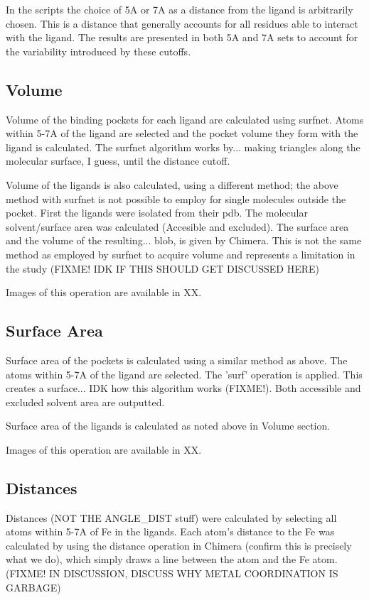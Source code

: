 	In the scripts the choice of 5A or 7A as a distance from the ligand is arbitrarily chosen. This is a distance that generally accounts for all residues able to interact with the ligand. The results are presented in both 5A and 7A sets to account for the variability introduced by these cutoffs. 
	
		\subsection*{Volume}
		
		Volume of the binding pockets for each ligand are calculated using surfnet. Atoms within 5-7A of the ligand are selected and the pocket volume they form with the ligand is calculated. The surfnet algorithm works by... making triangles along the molecular surface, I guess, until the distance cutoff.
		
		Volume of the ligands is also calculated, using a different method; the above method with surfnet is not possible to employ for single molecules outside the pocket. First the ligands were isolated from their pdb. The molecular solvent/surface area was calculated (Accesible and excluded). The surface area and the volume of the resulting... blob, is given by Chimera. This is not the same method as employed by surfnet to acquire volume and represents a limitation in the study (FIXME! IDK IF THIS SHOULD GET DISCUSSED HERE)
		
		Images of this operation are available in XX.
		
		\subsection*{Surface Area}
		Surface area of the pockets is calculated using a similar method as above. The atoms within 5-7A of the ligand are selected. The 'surf' operation is applied. This creates a surface... IDK how this algorithm works (FIXME!). Both accessible and excluded solvent area are outputted.
		
		Surface area of the ligands is calculated as noted above in Volume section.
	
		Images of this operation are available in XX. 
		
		\subsection*{Distances}
		
		Distances (NOT THE ANGLE_DIST stuff) were calculated by selecting all atoms within 5-7A of Fe in the ligands. Each atom's distance to the Fe was calculated by using the distance operation in Chimera (confirm this is precisely what we do), which simply draws a line between the atom and the Fe atom. (FIXME! IN DISCUSSION, DISCUSS WHY METAL COORDINATION IS GARBAGE) 
		
